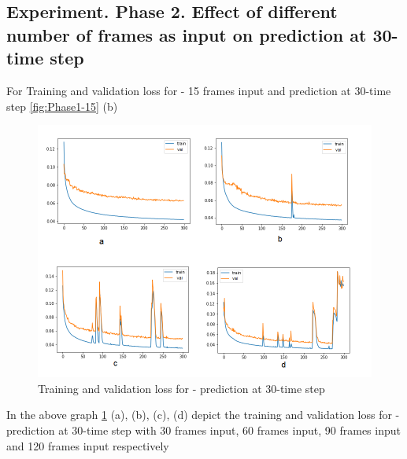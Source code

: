 \subsection{Experiment. Phase 2. Effect of different number of frames as input on prediction at 30-time step}
For Training and validation loss for - 15 frames input and prediction at 30-time step \ref{fig:Phase1-15} (b)

\begin{figure}[H] 
\includegraphics[scale=0.7]{Phase2-training}
\begin{center}
\caption{Training and validation loss for - prediction at 30-time step}
\label{fig:Phase2-at-30}
\end{center}
\end{figure}

In the above graph \ref{fig:Phase2-at-30} (a), (b), (c), (d) depict the training and validation loss for - prediction at 30-time step with 30 frames input, 60 frames input, 90 frames input and 120 frames input respectively \\



